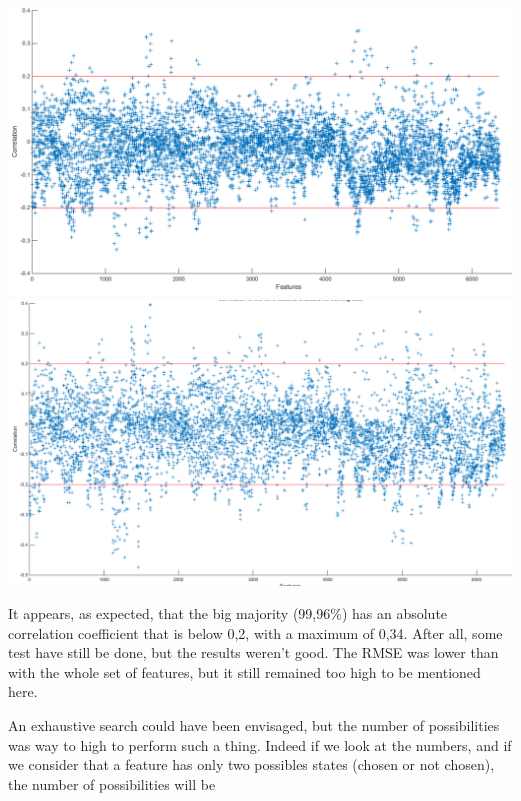 \documentclass{report}
\begin{document}
		\vspace{0.5cm}
		\begin{center}
			\includegraphics[scale=0.35]{ressources/corr1}
			\vspace{1cm}
			\includegraphics[scale=0.28]{ressources/corr2}
		\end{center}

		
		It appears, as expected, that the big majority (99,96\%) has an absolute correlation coefficient that is below 0,2, with a maximum of 0,34. After all, some test have still be done, but the results weren't good. The RMSE was lower than with the whole set of features, but it still remained too high to be mentioned here.
		
		An exhaustive search could have been envisaged, but the number of possibilities was way to high to perform such a thing. Indeed if we look at the numbers, and if we consider that a feature has only two possibles states (chosen or not chosen), the number of possibilities will be
		
\end{document}
